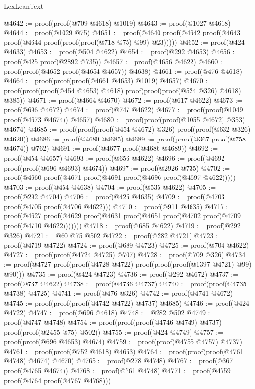 \begin{lexlean}{LexLeanText}
\begin{coremodule}
@4642 := proof(proof(@709 @4618) @1019)
@4643 := proof(@1027 @4618)
@4644 := proof(@1029 @75)
@4651 := proof(@4640 proof(@4642 proof(@4643 proof(@4644 proof(proof(proof(@718 @75) @99) @23)))))
@4652 := proof(@424 @4633)
@4653 := proof(@504 @4622)
@4654 := proof(@292 @4653)
@4656 := proof(@425 proof(@2892 @735))
@4657 := proof(@4656 @4622)
@4660 := proof(proof(@4652 proof(@4654 @4657)) @4638)
@4661 := proof(@476 @4618)
@4664 := proof(proof(proof(@4661 @4653) @1019) @4657)
@4670 := proof(proof(proof(@454 @4653) @4618) proof(proof(proof(@524 @326) @4618) @385))
@4671 := proof(@4664 @4670)
@4672 := proof(@617 @4622)
@4673 := proof(@696 @4672)
@4674 := proof(@747 @4622)
@4677 := proof(proof(@1049 proof(@4673 @4674)) @4657)
@4680 := proof(proof(proof(@1055 @4672) @353) @4674)
@4685 := proof(proof(proof(@454 @4672) @326) proof(proof(@632 @326) @4620))
@4686 := proof(@4680 @4685)
@4689 := proof(proof(@367 proof(@758 @4674)) @762)
@4691 := proof(@4677 proof(@4686 @4689))
@4692 := proof(@454 @4657)
@4693 := proof(@656 @4622)
@4696 := proof(@4692 proof(proof(@696 @4693) @4674))
@4697 := proof(@2926 @735)
@4702 := proof(@4660 proof(@4671 proof(@4691 proof(@4696 proof(@4697 @4622)))))
@4703 := proof(@454 @4638)
@4704 := proof(@535 @4622)
@4705 := proof(@292 @4704)
@4706 := proof(@425 @4635)
@4709 := proof(@4703 proof(@4705 proof(@4706 @4622)))
@4710 := proof(@911 @4635)
@4717 := proof(@4627
      proof(@4629 proof(@4631 proof(@4651 proof(@4702 proof(@4709 proof(@4710 @4622)))))))
@4718 := proof(@685 @4622)
@4719 := proof(@292 @326)
@4721 := @60 @75 @502
@4722 := proof(@282 @4721)
@4723 := proof(@4719 @4722)
@4724 := proof(@689 @4723)
@4725 := proof(@704 @4622)
@4727 := proof(proof(@4724 @4725) @707)
@4728 := proof(@709 @326)
@4734 := proof(@4727 proof(proof(@4728 @4722) proof(proof(proof(@1397 @4721) @99) @90)))
@4735 := proof(@424 @4723)
@4736 := proof(@292 @4672)
@4737 := proof(@737 @4622)
@4738 := proof(@4736 @4737)
@4740 := proof(proof(@4735 @4738) @4725)
@4741 := proof(@476 @326)
@4742 := proof(@4741 @4672)
@4745 := proof(proof(proof(@4742 @4722) @4737) @4685)
@4746 := proof(@424 @4722)
@4747 := proof(@696 @4618)
@4748 := @282 @502
@4749 := proof(@4747 @4748)
@4754 := proof(proof(proof(@4746 @4749) @4737) proof(proof(@2455 @75) @502))
@4755 := proof(@424 @4749)
@4757 := proof(proof(@696 @4653) @4674)
@4759 := proof(proof(@4755 @4757) @4737)
@4761 := proof(proof(@752 @4618) @4653)
@4764 := proof(proof(proof(@4761 @4748) @4674) @4670)
@4765 := proof(@278 @4748)
@4767 := proof(@367 proof(@4765 @4674))
@4768 := proof(@761 @4748)
@4771 := proof(@4759 proof(@4764 proof(@4767 @4768)))

\end{coremodule}
\end{lexlean}
